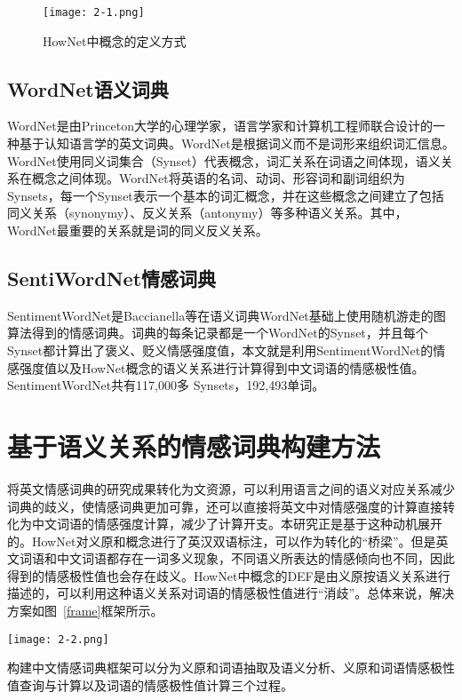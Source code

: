\begin{figure}[htp]
\centering
\texttt{[image: 2-1.png]}
\caption{HowNet中概念的定义方式}
\label{fig2-1}
\end{figure}

\subsection{WordNet语义词典}
WordNet是由Princeton大学的心理学家，语言学家和计算机工程师联合设计的一种基于认知语言学的英文词典。WordNet是根据词义而不是词形来组织词汇信息。WordNet使用同义词集合（Synset）代表概念，词汇关系在词语之间体现，语义关系在概念之间体现。WordNet将英语的名词、动词、形容词和副词组织为Synsets，每一个Synset表示一个基本的词汇概念，并在这些概念之间建立了包括同义关系（synonymy）、反义关系（antonymy）等多种语义关系。其中，WordNet最重要的关系就是词的同义反义关系。

\subsection{SentiWordNet情感词典}
SentimentWordNet是Baccianella等在语义词典WordNet基础上使用随机游走的图算法得到的情感词典。词典的每条记录都是一个WordNet的Synset，并且每个Synset都计算出了褒义、贬义情感强度值，本文就是利用SentimentWordNet的情感强度值以及HowNet概念的语义关系进行计算得到中文词语的情感极性值。SentimentWordNet共有117,000多 Synsets，192,493单词。

\section{基于语义关系的情感词典构建方法}
\label{ch2:construct}
将英文情感词典的研究成果转化为文资源，可以利用语言之间的语义对应关系减少词典的歧义，使情感词典更加可靠，还可以直接将英文中对情感强度的计算直接转化为中文词语的情感强度计算，减少了计算开支。本研究正是基于这种动机展开的。HowNet对义原和概念进行了英汉双语标注，可以作为转化的“桥梁”。但是英文词语和中文词语都存在一词多义现象，不同语义所表达的情感倾向也不同，因此得到的情感极性值也会存在歧义。HowNet中概念的DEF是由义原按语义关系进行描述的，可以利用这种语义关系对词语的情感极性值进行“消歧”。总体来说，解决方案如图~\ref{frame}框架所示。

\begin{landscape}
\begin{figure*}
\centering
\texttt{[image: 2-2.png]}
\caption{基于语义关系的情感词典解决方案}
\label{frame}
\end{figure*}
\end{landscape}
构建中文情感词典框架可以分为义原和词语抽取及语义分析、义原和词语情感极性值查询与计算以及词语的情感极性值计算三个过程。

